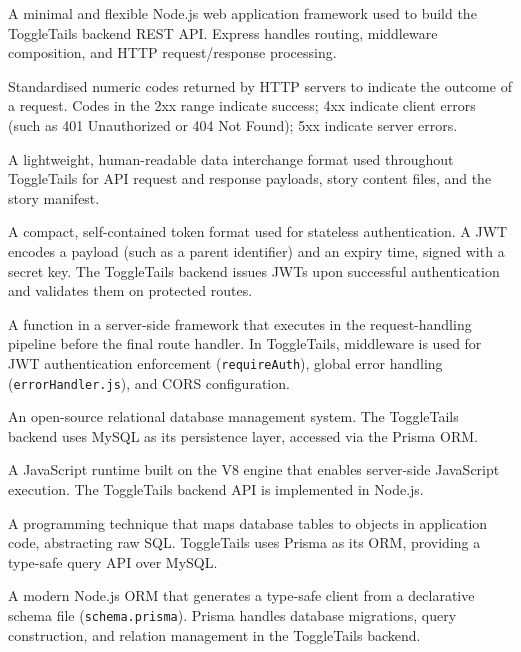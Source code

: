 \begin{description}[leftmargin=2.5cm, style=nextline]
\item[\textbf{Express.js}]
A minimal and flexible Node.js web application framework used to build the
ToggleTails backend REST API. Express handles routing, middleware composition,
and HTTP request/response processing.

\item[\textbf{HTTP Status Codes}]
Standardised numeric codes returned by HTTP servers to indicate the outcome
of a request. Codes in the 2xx range indicate success; 4xx indicate client
errors (such as 401 Unauthorized or 404 Not Found); 5xx indicate server
errors.

\item[\textbf{JSON (JavaScript Object Notation)}]
A lightweight, human-readable data interchange format used throughout
ToggleTails for API request and response payloads, story content files,
and the story manifest.

\item[\textbf{JWT (JSON Web Token)}]
A compact, self-contained token format used for stateless authentication. A
JWT encodes a payload (such as a parent identifier) and an expiry time,
signed with a secret key. The ToggleTails backend issues JWTs upon successful
authentication and validates them on protected routes.

\item[\textbf{Middleware}]
A function in a server-side framework that executes in the request-handling
pipeline before the final route handler. In ToggleTails, middleware is used
for JWT authentication enforcement (\texttt{requireAuth}), global error
handling (\texttt{errorHandler.js}), and CORS configuration.

\item[\textbf{MySQL}]
An open-source relational database management system. The ToggleTails backend
uses MySQL as its persistence layer, accessed via the Prisma ORM.

\item[\textbf{Node.js}]
A JavaScript runtime built on the V8 engine that enables server-side
JavaScript execution. The ToggleTails backend API is implemented in Node.js.

\item[\textbf{ORM (Object-Relational Mapping)}]
A programming technique that maps database tables to objects in application
code, abstracting raw SQL. ToggleTails uses Prisma as its ORM, providing a
type-safe query API over MySQL.

\item[\textbf{Prisma}]
A modern Node.js ORM that generates a type-safe client from a declarative
schema file (\texttt{schema.prisma}). Prisma handles database migrations,
query construction, and relation management in the ToggleTails backend.


\end{description}
